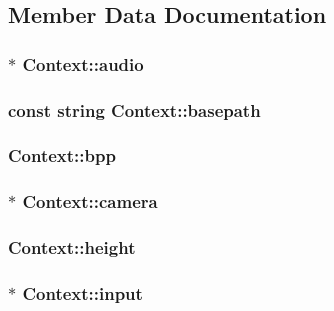 \subsection{Member Data Documentation}
\hypertarget{class_context_a3302ca284ccc8094ce2a497dcb06a4a0}{
\subsubsection[{audio}]{$\ast$ Context\-::audio}}\label{class_context_a3302ca284ccc8094ce2a497dcb06a4a0}
\hypertarget{class_context_a46fc0cafaea89f78f5838b8bc9ff253d}{
\subsubsection[{basepath}]{\setlength{\rightskip}{0pt plus 5cm}const {\bf string} Context\-::basepath\hspace{0.3cm}{\ttfamily [static]}}}\label{class_context_a46fc0cafaea89f78f5838b8bc9ff253d}
\hypertarget{class_context_aa91061e75e7d3e18df95ae92f13f1a22}{
\subsubsection[{bpp}]{ Context\-::bpp}}\label{class_context_aa91061e75e7d3e18df95ae92f13f1a22}
\hypertarget{class_context_a178048052fa4964079e3330ac5598559}{
\subsubsection[{camera}]{$\ast$ Context\-::camera}}\label{class_context_a178048052fa4964079e3330ac5598559}
\hypertarget{class_context_a739c078fee0bb19a95f3dee7dc108739}{
\subsubsection[{height}]{ Context\-::height}}\label{class_context_a739c078fee0bb19a95f3dee7dc108739}
\hypertarget{class_context_ae8838a6789805b90ba8c159d6efe471d}{
\subsubsection[{input}]{$\ast$ Context\-::input}}\label{class_context_ae8838a6789805b90ba8c159d6efe471d}
